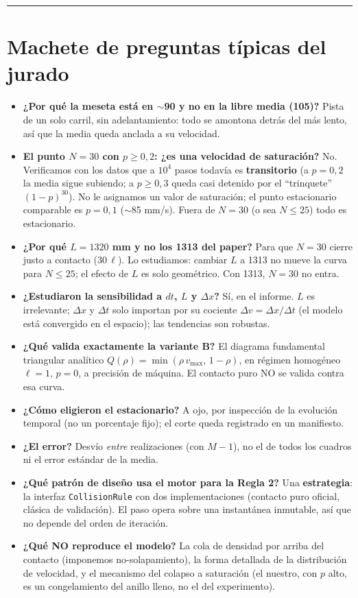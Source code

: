 \documentclass[11pt,a4paper]{article}
\begin{document}
\vspace{6pt}
\hrule
\vspace{4pt}

\section*{Machete de preguntas típicas del jurado}

\begin{itemize}[leftmargin=1.2em,itemsep=3pt]
\item \textbf{¿Por qué la meseta está en $\sim$90 y no en la libre media (105)?} Pista de un solo carril,
  sin adelantamiento: todo se amontona detrás del más lento, así que la media queda anclada a su velocidad.
\item \textbf{El punto $N=30$ con $p\ge0{,}2$: ¿es una velocidad de saturación?} No. Verificamos con los
  datos que a $10^4$ pasos todavía es \textbf{transitorio} (a $p=0{,}2$ la media sigue subiendo; a
  $p\ge0{,}3$ queda casi detenido por el ``trinquete'' $(1-p)^{30}$). No le asignamos un valor de
  saturación; el punto estacionario comparable es $p=0{,}1$ ($\sim$85 mm/s). Fuera de $N=30$ (o sea
  $N\le25$) todo es estacionario.
\item \textbf{¿Por qué $L=1320$ mm y no los 1313 del paper?} Para que $N=30$ cierre justo a contacto
  ($30\,\ell$). Lo estudiamos: cambiar $L$ a 1313 no mueve la curva para $N\le25$; el efecto de $L$ es solo
  geométrico. Con 1313, $N=30$ no entra.
\item \textbf{¿Estudiaron la sensibilidad a $dt$, $L$ y $\Delta x$?} Sí, en el informe. $L$ es irrelevante;
  $\Delta x$ y $\Delta t$ solo importan por su cociente $\Delta v=\Delta x/\Delta t$ (el modelo está
  convergido en el espacio); las tendencias son robustas.
\item \textbf{¿Qué valida exactamente la variante B?} El diagrama fundamental triangular analítico
  $Q(\rho)=\min(\rho\,v_{\max},\,1-\rho)$, en régimen homogéneo $\ell=1$, $p=0$, a precisión de máquina.
  El contacto puro NO se valida contra esa curva.
\item \textbf{¿Cómo eligieron el estacionario?} A ojo, por inspección de la evolución temporal (no un
  porcentaje fijo); el corte queda registrado en un manifiesto.
\item \textbf{¿El error?} Desvío \emph{entre} realizaciones (con $M-1$), no el de todos los cuadros ni el
  error estándar de la media.
\item \textbf{¿Qué patrón de diseño usa el motor para la Regla 2?} Una \textbf{estrategia}: la interfaz
  \texttt{CollisionRule} con dos implementaciones (contacto puro oficial, clásica de validación). El paso
  opera sobre una instantánea inmutable, así que no depende del orden de iteración.
\item \textbf{¿Qué NO reproduce el modelo?} La cola de densidad por arriba del contacto (imponemos
  no-solapamiento), la forma detallada de la distribución de velocidad, y el mecanismo del colapso a
  saturación (el nuestro, con $p$ alto, es un congelamiento del anillo lleno, no el del experimento).
\end{itemize}
\end{document}
